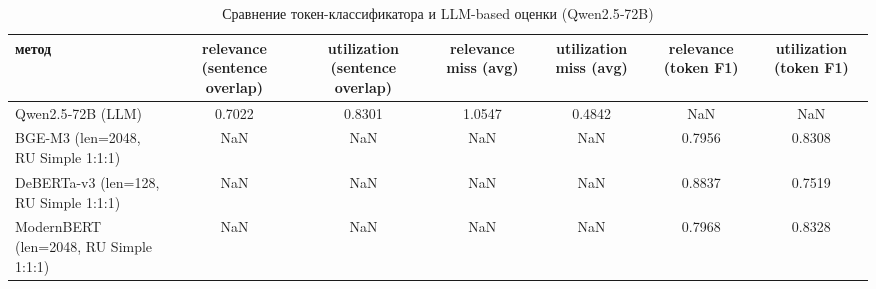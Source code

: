 \begin{table}
\caption{Сравнение токен-классификатора и LLM-based оценки (Qwen2.5‑72B)}
\label{tab:classifier_vs_llm}
\begin{tabular}{lcccccc}
\toprule
метод & relevance (sentence overlap) & utilization (sentence overlap) & relevance miss (avg) & utilization miss (avg) & relevance (token F1) & utilization (token F1) \\
\midrule
Qwen2.5‑72B (LLM) & 0.7022 & 0.8301 & 1.0547 & 0.4842 & NaN & NaN \\
BGE-M3 (len=2048, RU Simple 1:1:1) & NaN & NaN & NaN & NaN & 0.7956 & 0.8308 \\
DeBERTa-v3 (len=128, RU Simple 1:1:1) & NaN & NaN & NaN & NaN & 0.8837 & 0.7519 \\
ModernBERT (len=2048, RU Simple 1:1:1) & NaN & NaN & NaN & NaN & 0.7968 & 0.8328 \\
\bottomrule
\end{tabular}
\end{table}
